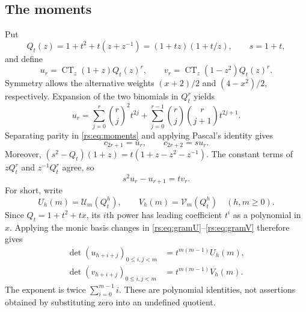 \documentclass[11pt]{article}
\theoremstyle{definition}
\theoremstyle{remark}
\newcommand{\CT}{\operatorname{CT}}
\newcommand{\UU}{\mathcal U}
\newcommand{\VV}{\mathcal V}
\theoremstyle{definition}
\theoremstyle{plain}
\numberwithin{equation}{section}
\begin{document}
\subsection{The moments}
Put
\begin{equation}
 Q_t(z)=1+t^2+t(z+z^{-1})=(1+tz)(1+t/z),\qquad s=1+t,
 \label{rs:eq:Q}
\end{equation}
and define
\begin{equation}
 u_r=\CT_z(1+z)Q_t(z)^r,\qquad
 v_r=\CT_z(1-z^2)Q_t(z)^r.
 \label{rs:eq:uv}
\end{equation}
Symmetry allows the alternative weights $(x+2)/2$ and $(4-x^2)/2$,
respectively. Expansion of the two binomials in $Q_t^r$ yields
\begin{equation}
 u_r=\sum_{j=0}^{r}\binom rj^2t^{2j}
       +\sum_{j=0}^{r-1}\binom rj\binom r{j+1}t^{2j+1}.
 \label{rs:eq:u-expansion}
\end{equation}
Separating parity in \eqref{rs:eq:moments} and applying Pascal's identity gives
\begin{equation}
 c_{2r+1}=u_r,\qquad c_{2r+2}=s u_r.
 \label{rs:eq:pair}
\end{equation}
Moreover,
$(s^2-Q_t)(1+z)=t(1+z-z^2-z^{-1})$.
The constant terms of $zQ_t^r$ and $z^{-1}Q_t^r$ agree, so
\begin{equation}
 s^2u_r-u_{r+1}=t v_r.
 \label{rs:eq:christoffel-pair}
\end{equation}
For short, write
\begin{equation}
 U_h(m)=\UU_m(Q_t^h),\qquad V_h(m)=\VV_m(Q_t^h)
 \quad(h,m\ge0).
 \label{rs:eq:UVh}
\end{equation}
Since $Q_t=1+t^2+tx$, its $i$th power has leading coefficient $t^i$
as a polynomial in $x$. Applying the monic basis changes in
\eqref{rs:eq:gramU}--\eqref{rs:eq:gramV} therefore gives
\begin{align}
 \det(u_{h+i+j})_{0\le i,j<m}&=t^{m(m-1)}U_h(m),\label{rs:eq:Gram-u}\\
 \det(v_{h+i+j})_{0\le i,j<m}&=t^{m(m-1)}V_h(m).
 \label{rs:eq:Gram-v}
\end{align}
The exponent is twice $\sum_{i=0}^{m-1}i$. These are polynomial identities,
not assertions obtained by substituting zero into an undefined quotient.
\end{document}

